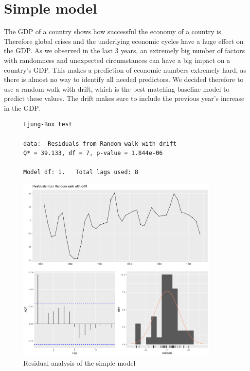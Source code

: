 \documentclass[10pt]{article}
\begin{document}
\section{Simple model}
The GDP of a country shows how successful the economy of a country is. Therefore global crises and the underlying economic cycles have a huge effect on the GDP. As we observed in the last 3 years, an extremely big number of factors with randomness and unexpected circumstances can have a big impact on a country's GDP. This makes a prediction of economic numbers extremely hard, as there is almost no way to identify all needed predictors. We decided therefore to use a random walk with drift, which is the best matching baseline model to predict these values. The drift makes sure to include the previous year's increase in the GDP.

\vspace{.5cm}
\begin{figure}[h]
\begin{minipage}{.7\textwidth}  %
\lstset{linewidth = 6cm, breaklines=true} %
\begin{lstlisting}[basicstyle=\footnotesize,numbers=none]
Ljung-Box test

data:  Residuals from Random walk with drift
Q* = 39.133, df = 7, p-value = 1.844e-06

Model df: 1.   Total lags used: 8
\end{lstlisting}
\label{lst:rw_drift}
\end{minipage}
\qquad %
\begin{minipage}{0.6\textwidth} %
    \centering
    \includegraphics[width=0.9\textwidth]{img/check_resid_simple_model.png}
    \caption{Residual analysis of the simple model}
    \label{fig:resid_simple}
\end{minipage}
\end{figure}
\end{document}
